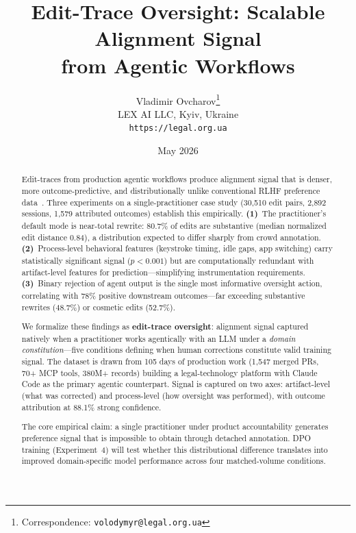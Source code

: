 \documentclass[11pt]{article}
\title{%
  Edit-Trace Oversight: Scalable Alignment Signal \\
  from Agentic Workflows%
}
\author{
  Vladimir Ovcharov\thanks{Correspondence: \texttt{volodymyr@legal.org.ua}}\\
  LEX AI LLC, Kyiv, Ukraine\\
  \texttt{https://legal.org.ua}
}
\date{May 2026}
\begin{document}
\maketitle

\begin{abstract}
Edit-traces from production agentic workflows produce alignment signal that is denser, more outcome-predictive, and distributionally unlike conventional RLHF preference data~\citep{christiano2017deep, ouyang2022training}.
Three experiments on a single-practitioner case study (30{,}510 edit pairs, 2{,}892 sessions, 1{,}579 attributed outcomes) establish this empirically.
\textbf{(1)}~The practitioner's default mode is near-total rewrite: 80.7\% of edits are substantive (median normalized edit distance 0.84), a distribution expected to differ sharply from crowd annotation.
\textbf{(2)}~Process-level behavioral features (keystroke timing, idle gaps, app switching) carry statistically significant signal ($p < 0.001$) but are computationally redundant with artifact-level features for prediction---simplifying instrumentation requirements.
\textbf{(3)}~Binary rejection of agent output is the single most informative oversight action, correlating with 78\% positive downstream outcomes---far exceeding substantive rewrites (48.7\%) or cosmetic edits (52.7\%).

We formalize these findings as \textbf{edit-trace oversight}: alignment signal captured natively when a practitioner works agentically with an LLM under a \emph{domain constitution}---five conditions defining when human corrections constitute valid training signal.
The dataset is drawn from 105 days of production work (1{,}547 merged PRs, 70+ MCP tools, 380M+ records) building a legal-technology platform with Claude Code as the primary agentic counterpart.
Signal is captured on two axes: artifact-level (what was corrected) and process-level (how oversight was performed), with outcome attribution at 88.1\% strong confidence.

The core empirical claim: a single practitioner under product accountability generates preference signal that is impossible to obtain through detached annotation.
DPO training (Experiment~4) will test whether this distributional difference translates into improved domain-specific model performance across four matched-volume conditions.
\end{abstract}
\end{document}
